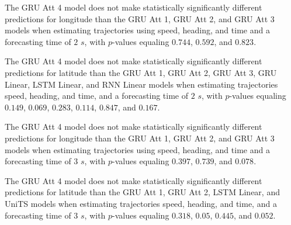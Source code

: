 The GRU Att 4 model does not make statistically significantly different predictions for longitude than the GRU Att 1, GRU Att 2, and GRU Att 3 models when estimating trajectories using speed, heading, and time and a forecasting time of $2$ $s$, with $p$-values equaling $0.744$, $0.592$, and $0.823$.

The GRU Att 4 model does not make statistically significantly different predictions for latitude than the GRU Att 1, GRU Att 2, GRU Att 3, GRU Linear, LSTM Linear, and RNN Linear models when estimating trajectories speed, heading, and time, and a forecasting time of $2$ $s$, with $p$-values equaling $0.149$, $0.069$, $0.283$, $0.114$, $0.847$, and $0.167$.

The GRU Att 4 model does not make statistically significantly different predictions for longitude than the GRU Att 1, GRU Att 2, and GRU Att 3 models when estimating trajectories using speed, heading, and time and a forecasting time of $3$ $s$, with $p$-values equaling $0.397$, $0.739$, and $0.078$.

The GRU Att 4 model does not make statistically significantly different predictions for latitude than the GRU Att 1, GRU Att 2, LSTM Linear, and UniTS models when estimating trajectories speed, heading, and time, and a forecasting time of $3$ $s$, with $p$-values equaling $0.318$, $0.05$, $0.445$, and $0.052$.

